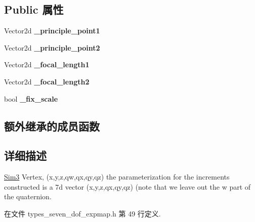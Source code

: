 \subsection*{Public 属性}
\begin{DoxyCompactItemize}
\item 
\hypertarget{classg2o_1_1VertexSim3Expmap_a0bf270a1f6d9f45e5b1ee683d4877e1d}{Vector2d {\bfseries \-\_\-principle\-\_\-point1}}\label{classg2o_1_1VertexSim3Expmap_a0bf270a1f6d9f45e5b1ee683d4877e1d}

\item 
\hypertarget{classg2o_1_1VertexSim3Expmap_aae09e8dc5707e524901e49af4d022edb}{Vector2d {\bfseries \-\_\-principle\-\_\-point2}}\label{classg2o_1_1VertexSim3Expmap_aae09e8dc5707e524901e49af4d022edb}

\item 
\hypertarget{classg2o_1_1VertexSim3Expmap_a05a79614b17cc700acaeb86039c2e181}{Vector2d {\bfseries \-\_\-focal\-\_\-length1}}\label{classg2o_1_1VertexSim3Expmap_a05a79614b17cc700acaeb86039c2e181}

\item 
\hypertarget{classg2o_1_1VertexSim3Expmap_a05c121f708922185d7b0823251c28290}{Vector2d {\bfseries \-\_\-focal\-\_\-length2}}\label{classg2o_1_1VertexSim3Expmap_a05c121f708922185d7b0823251c28290}

\item 
\hypertarget{classg2o_1_1VertexSim3Expmap_a63854235b605e45825798d327890930e}{bool {\bfseries \-\_\-fix\-\_\-scale}}\label{classg2o_1_1VertexSim3Expmap_a63854235b605e45825798d327890930e}

\end{DoxyCompactItemize}
\subsection*{额外继承的成员函数}


\subsection{详细描述}
\hyperlink{structg2o_1_1Sim3}{Sim3} Vertex, (x,y,z,qw,qx,qy,qz) the parameterization for the increments constructed is a 7d vector (x,y,z,qx,qy,qz) (note that we leave out the w part of the quaternion. 

在文件 types\-\_\-seven\-\_\-dof\-\_\-expmap.\-h 第 49 行定义.



